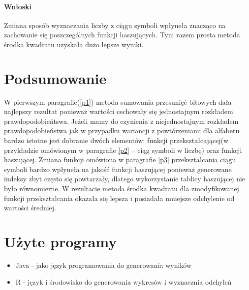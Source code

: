 \documentclass{article}
\begin{document}
			\paragraph{Wnioski}
			Zmiana sposób wyznaczania liczby z ciągu symboli wpłyneła znacząco na zachowanie się poszczególnych funkcji haszujących. Tym razem prosta metoda środka kwadratu uzyskała dużo lepsze wyniki.
			
\section{Podsumowanie}
W pierwszym paragrafie(\ref{p1}) metoda sumowania przesunięć bitowych dała najlepszy rezultat ponieważ wartości cechowały się jednostajnym rozkładem prawdopodobieńtswa. Jeżeli mamy do czynienia z niejednostajnym rozkładem prawdopodobieństwa jak w przypadku wariancji z powtórzeniami dla alfabetu bardzo istotne jest dobranie dwóch elementów: funkcji przekształcającej(w przykładzie omówionym w paragrafie \ref{p2} -- ciąg symboli w liczbę) oraz funkcji haszującej. Zmiana funkcji omówiona w paragrafie \ref{p3} przekształcania ciągu symboli bardzo wpłyneła na jakość funkcji haszującej ponieważ generowane indeksy zbyt często się powtarzały, dlatego wykorzystanie tablicy haszującej nie było równomierne. W rezultacie metoda środka kwadratu dla zmodyfikowanej funkcji przekształcania okazała się lepsza i posiadała mniejsze odchylenie od wartości średniej.

\section{Użyte programy}
\begin{itemize}
	\item Java - jako język programowania do generowania wyników
	\item R - język i środowisko do generowania wykresów i wyznacznia odchyleń
\end{itemize}
\end{document}
